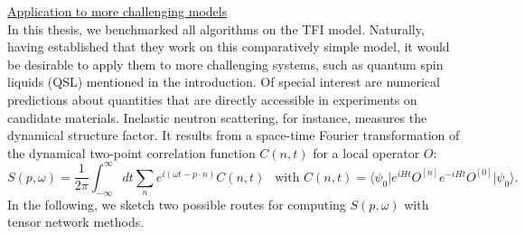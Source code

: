 \noindent \underline{Application to more challenging models} \\[0.5em]
In this thesis, we benchmarked all algorithms on the TFI model. Naturally, having established that they work on this comparatively simple model, it would be desirable to apply them to more challenging systems, such as quantum spin liquids (QSL) mentioned in the introduction. Of special interest are numerical predictions about quantities that are directly accessible in experiments on candidate materials. Inelastic neutron scattering, for instance, measures the dynamical structure factor. It results from a space-time Fourier transformation of the dynamical two-point correlation function $C(n, t)$ for a local operator $O$:
\begin{equation}
	S(p, \omega) = \frac{1}{2 \pi} \int_{-\infty}^{\infty} dt \sum_n e^{i(\omega t - p \cdot n)} C(n, t) 
	\:\: \text{ with } C(n, t) = \langle \psi_0 \vert e^{iHt} O^{[n]} e^{-iHt} O^{[0]} \vert \psi_0 \rangle.
\end{equation}
In the following, we sketch two possible routes for computing $S(p, \omega)$ with tensor network methods.
